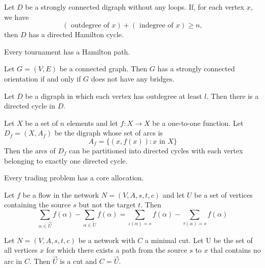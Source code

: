\begin{theorem}
  \label{thm:13.1.4}
  Let $D$ be a strongly connected digraph without any loops. If, for each vertex $x$, we have
  $$
  (\text { outdegree of } x)+(\text { indegree of } x) \geq n,
  $$
  then $D$ has a directed Hamilton cycle.
\end{theorem}

\begin{theorem}
  \label{thm:13.1.5}
  Every tournament has a Hamilton path.
\end{theorem}

\begin{theorem}
  \label{thm:13.1.6}
  Let $G = (V, E)$ be a connected graph. Then $G$ has a strongly connected orientation if and only if $G$ does not have any bridges.
\end{theorem}

\begin{lemma}
  \label{lem:13.1.7}
  Let $D$ be a digraph in which each vertex has outdegree at least $l$. Then there is a directed cycle in $D$.
\end{lemma}

\begin{corollary}
  \label{cor:13.1.8}
  Let $X$ be a set of $n$ elements and let $f: X \rightarrow X$ be a one-to-one function. Let $D_f=\left(X, A_f\right)$ be the digraph whose set of arcs is
  $$
  A_f=\{(x, f(x)): x \text { in } X\}
  $$
  Then the arcs of $D_f$ can be partitioned into directed cycles with each vertex belonging to exactly one directed cycle.
\end{corollary}

\begin{theorem}
  \label{thm:13.1.9}
  Every trading problem has a core allocation.
\end{theorem}

\begin{lemma}
  \label{lem:13.2.1}
  Let $f$ be a flow in the network $N=(V, A, s, t, c)$ and let $U$ be a set of vertices containing the source $s$ but not the target $t$. Then
  $$
  \sum\limits_{\alpha \in \vec{U}} f(\alpha)-\sum\limits_{\alpha \in \overleftarrow{U}} f(\alpha)=\sum\limits_{\iota(\alpha)=s} f(\alpha)-\sum\limits_{\tau(\alpha)=s} f(\alpha)
  $$
\end{lemma}

\begin{lemma}
  \label{lem:13.2.2}
  Let $N=(V, A, s, t, c)$ be a network with $C$ a minimal cut. Let U be the set of all vertices $x$ for which there exists a path from the source $s$ to $x$ thal contains no arc in $C$. Then $\vec{U}$ is a cut and $C=\vec{U}$.
\end{lemma}

